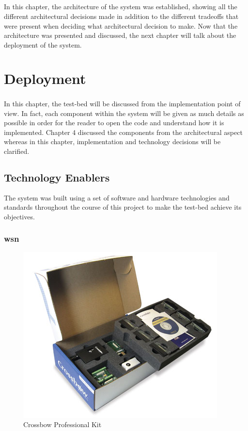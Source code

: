 \documentclass[12pt,a4paper,final]{report}
\begin{document}
\paragraph{}
In this chapter, the architecture of the system was established, showing all the different architectural decisions made in addition to the different tradeoffs that were present when deciding what architectural decision to make. Now that the architecture was presented and discussed, the next chapter will talk about the deployment of the system.

\chapter{Deployment}
\paragraph{}
In this chapter, the test-bed will be discussed from the implementation point of view. In fact, each component within the system will be given as much details as possible in order for the reader to open the code and understand how it is implemented. Chapter 4 discussed the components from the architectural aspect whereas in this chapter, implementation and technology decisions will be clarified.
\section{Technology Enablers}
The system was built using a set of software and hardware technologies and standards throughout the course of this project to make the test-bed achieve its objectives.
\subsection{\gls{wsn}}

\begin{figure}[htbp]
\centering
\includegraphics[scale=0.6]{img/crossbow.jpg}
\caption{Crossbow Professional Kit}
\label{fig:crossbow}
\end{figure}
\end{document}
